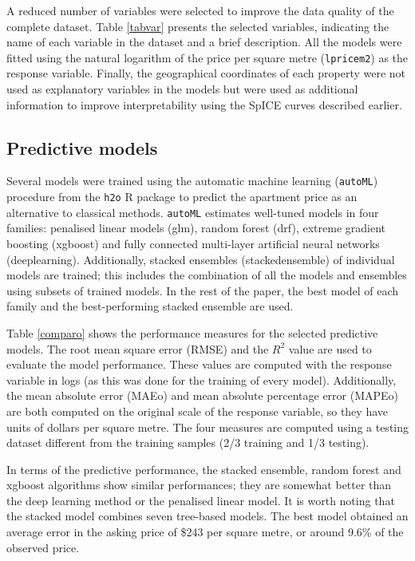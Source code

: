 \documentclass[smallextended,natbib]{svjour3}\usepackage[]{graphicx}\usepackage[]{xcolor}
\newcommand{\1}[1]{\mathbbm{1}_{#1}}
\begin{document}
A reduced number of variables were selected to improve the data quality of the complete dataset. Table \ref{tabvar} presents the selected variables, indicating the name of each variable in the dataset and a brief description. All the models were fitted using the natural logarithm of the  price per square metre (\texttt{lpricem2}) as the response variable. Finally, the geographical coordinates of each property were not used as explanatory variables in the models but were used as additional information to improve interpretability using the SpICE curves described earlier.
 
\subsection{Predictive models}
\label{modelo} 

Several models were trained %
using the automatic machine learning (\texttt{autoML}) procedure from the \texttt{h2o} R package \citep{h2o} to predict the apartment  price as an alternative to classical methods. \texttt{autoML} estimates well-tuned models in four families: penalised linear models (glm), random forest (drf), extreme gradient boosting (xgboost) and fully connected multi-layer artificial neural networks (deeplearning). Additionally,  stacked ensembles (stackedensemble) of individual models are trained; this includes the combination of all the models and ensembles using subsets of trained models. In the rest of the paper, the best model of each family and the best-performing stacked ensemble are used. 

Table \ref{comparo} shows the  performance measures for the selected predictive models.  The root mean square error (RMSE) and the $R^2$ value are used to evaluate the model performance. These values are computed with the response variable in logs (as this was done for the training of every model). Additionally, the mean absolute error (MAEo) and mean absolute percentage error (MAPEo) are both computed on the original scale of the response variable, so they have units of dollars per square metre.  The four measures are computed using a testing dataset different from the training samples (2/3 training and 1/3 testing). 


In terms of the predictive performance, the stacked ensemble, random forest and xgboost algorithms show similar performances; they are somewhat better than the deep learning method or the penalised linear model. It is worth noting that the stacked model combines seven tree-based models. The best model obtained an average error in the asking price of \$243 per square metre, or around 9.6\% of the observed price.  %
\end{document}
